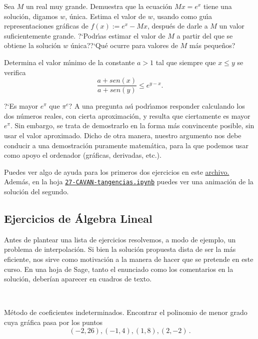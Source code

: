 \begin{ejer}
	Sea $M$ un real muy grande. Demuestra que la ecuaci\'on $Mx=e^x$ tiene una soluci\'on, digamos $w$,  \'unica. Estima el valor de $w$, usando como gu\'{\i}a representaciones gr\'aficas de $f(x):=e^x-Mx$, despu\'es de darle a $M$ un valor suficientemente grande. ?`Podr\'{\i}as estimar el valor de $M$ a partir del que se obtiene la soluci\'on $w$ \'unica??`Qu\'e ocurre para valores de $M$ m\'as peque\~nos?
 \end{ejer}

\begin{ejer} Determina el valor m\'{\i}nimo de la constante $a>1$ tal que siempre que $x\le y$  se verifica 
	\[\frac{a+sen(x)}{a+sen(y)}\le e^{y-x}.\]
	
\end{ejer}
\begin{ejer}
	?`Es mayor $e^{\pi}$ que $\pi^{e}$? A una pregunta as\'{\i} podr\'{\i}amos responder calculando los dos n\'umeros reales, con cierta aproximaci\'on, y resulta que ciertamente es mayor $e^{\pi}$. Sin embargo, se trata de demostrarlo en la forma m\'as convincente posible,  sin usar el  valor aproximado. Dicho de otra manera, nuestro argumento nos debe conducir a una demostraci\'on puramente matem\'atica, para la que podemos usar como apoyo el ordenador (gr\'aficas, derivadas, etc.).
	
	\end{ejer}

Puedes ver algo de ayuda para los primeros dos  ejercicios en este
\href{http://150.244.21.37/PDFs/CAVAN/dos_ejercicios_calculo.pdf}{archivo.} Adem\'as, en la hoja
\href{http://localhost:8888/notebooks/CAVAN/27-CAVAN-tangencias.ipynb}{\tt 27-CAVAN-tangencias.ipynb}
puedes ver una animaci\'on de la soluci\'on del segundo.


\subsection{Ejercicios de Álgebra Lineal}\label{interp1}

Antes de plantear una lista de ejercicios  resolvemos, a modo de
ejemplo, un problema de interpolación. Si bien la solución propuesta dista de
ser la más eficiente,
nos sirve como motivación a la manera de hacer que se pretende en este curso. En
una hoja
de Sage, tanto el enunciado como los comentarios en la solución, deberían
aparecer en
cuadros de texto.

\

\begin{ejer}\label{coef-indet} {\upshape Método de coeficientes indeterminados}.
 Encontrar el polinomio de menor grado cuya gráfica pasa por los puntos
 $$
 (-2, 26), (-1, 4), (1, 8), (2, -2)\,.
 $$ 
\end{ejer}


